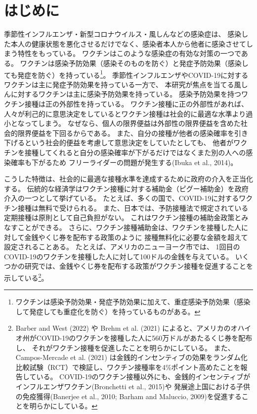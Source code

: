 \documentclass[
  11pt,
  a4paper,
]{article}
\date{}
\begin{document}
\newpage
\thispagestyle{empty}
\phantom{a}
\newpage

\hypertarget{intro}{%
\section{はじめに}\label{intro}}

季節性インフルエンザ・新型コロナウイルス・風しんなどの感染症は、
感染した本人の健康状態を悪化させるだけでなく、感染者本人から他者に感染させてしまう特性をもっている。
ワクチンはこのような感染症の有効な対策の一つである。
ワクチンは感染予防効果（感染そのものを防ぐ）と発症予防効果（感染しても発症を防ぐ）を持っている\footnote{ワクチンは感染予防効果・発症予防効果に加えて、重症感染予防効果（感染して発症しても重症化を防ぐ）を持っているものがある。}。
季節性インフルエンザやCOVID-19に対するワクチンは主に発症予防効果を持っている一方で、
本研究が焦点を当てる風しんに対するワクチンは主に感染予防効果を持っている。
感染予防効果を持つワクチン接種は正の外部性を持っている。
ワクチン接種に正の外部性があれば、
人々が利己的に意思決定をしているとワクチン接種は社会的に最適な水準より過小となってしまう。
なぜなら、個人の限界便益は外部性の限界便益を含めた社会的限界便益を下回るからである。
また、自分の接種が他者の感染確率を引き下げるという社会的便益を考慮して意思決定をしていたとしても、
他者がワクチンを接種してくれると自分の感染確率が下がるだけではなくまた別の人への感染確率も下がるため
フリーライダーの問題が発生する(Ibuka et al., 2014)。

こうした特徴は、社会的に最適な接種水準を達成するために政府の介入を正当化する。
伝統的な経済学はワクチン接種に対する補助金（ピグー補助金）を政府介入の一つとして挙げている。
たとえば、多くの国で、COVID-19に対するワクチン接種は無料で受けられる。
また、日本では、予防接種法で規定されている定期接種は原則として自己負担がない。
これはワクチン接種の補助金政策とみなすことができる。
さらに、ワクチン接種補助金は、ワクチンを接種した人に対して金銭やくじ券を配布する政策のように
接種無料化に必要な金額を超えて設定されることある。
たとえば、アメリカのニューヨーク市では、
1回目のCOVID-19のワクチンを接種した人に対して100ドルの金銭を与えている。
いくつかの研究では、金銭やくじ券を配布する政策がワクチン接種を促進することを示している\footnote{Barber and West (2022) や Brehm et al. (2021) によると、アメリカのオハイオ州がCOVID-19のワクチンを接種した人に560万ドルがあたるくじ券を配布し、
  それがワクチン接種を促進したことを明らかにしている。
  また、Campos-Mercade et al. (2021) は金銭的インセンティブの効果をランダム化比較試験（RCT）で検証し、ワクチン接種率を4\%ポイント高めたことを報告している。
  COVID-19のワクチン接種以外にも、金銭的インセンティブがインフルエンザワクチン(Bronchetti et al., 2015)や
  発展途上国における子供の免疫獲得(Banerjee et al., 2010; Barham and Maluccio, 2009)を促進することを明らかにしている。}。
\end{document}
